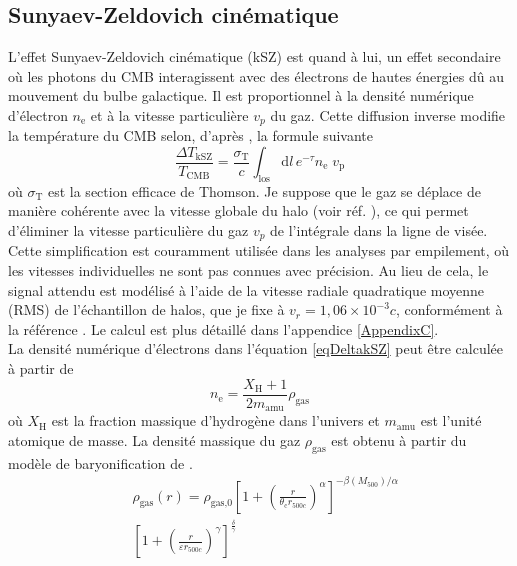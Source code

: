 \documentclass[a4paper, french, twoside, twocolumn, 11 pt]{article}
\newcommand{\deriv}{\mathrm{d}}
\begin{document}
\subsection{Sunyaev-Zeldovich cinématique}
L'effet Sunyaev-Zeldovich cinématique (kSZ) est quand à lui, un effet secondaire où les photons du CMB interagissent avec des électrons de hautes énergies dû au mouvement du bulbe galactique. Il est proportionnel à la densité numérique d'électron $n_\text{e}$ et à la vitesse particulière $v_p$ du gaz.
Cette diffusion inverse modifie la température du CMB selon, d'après \cite{Sunyaev_1972}, la formule suivante
\begin{equation}
\label{eqDeltakSZ}
\frac{\Delta T_\text{kSZ}}{T_\text{CMB}}=\frac{\sigma_\text{T}}{c}\int_\text{los} \deriv l\,e^{-\tau} n_\text{e} \; v_\text{p}
\end{equation}
où $\sigma_\text{T}$ est la section efficace de Thomson. Je suppose que le gaz se déplace de manière cohérente avec la vitesse globale du halo (voir réf. \cite{Hadzhiyska2023}), ce qui permet d'éliminer la vitesse particulière du gaz $v_p$ de l'intégrale dans la ligne de visée. Cette simplification est couramment utilisée dans les analyses par empilement, où les vitesses individuelles ne sont pas connues avec précision. Au lieu de cela, le signal attendu est modélisé à l'aide de la vitesse radiale quadratique moyenne (RMS) de l'échantillon de halos, que je fixe à $v_r = 1,06 \times 10^{-3}c$, conformément à la référence \cite{Amodeo2021}. Le calcul est plus détaillé dans l'appendice \ref{AppendixC}.\\
La densité numérique d'électrons dans l'équation \ref{eqDeltakSZ} peut être calculée à partir de
\begin{equation}
n_\mathrm{e} = \frac{X_\mathrm{H} + 1}{2 m_\mathrm{amu}} \rho_\mathrm{gas}
\end{equation}
où $X_\mathrm{H}$ est la fraction massique d'hydrogène dans l'univers et $m_\mathrm{amu}$ est l'unité atomique de masse. La densité massique du gaz $\rho_\mathrm{gas}$ est obtenu à partir du modèle de baryonification de \cite{schneider2025baryonificationalternativehydrodynamicalsimulations}.
\begin{equation}
\begin{split}
& \rho_\text{gas}(r) = \rho_\text{gas,0}\left[1+\left(\frac{r}{\theta_\text{c}r_{500c}}\right)^{\alpha}\right]^{-\beta(M_{500})/\alpha} \\
& \left[1+\left(\frac{r}{\varepsilon r_{500c}}\right)^{\gamma}\right]^{\frac{\delta}{\gamma}}
\end{split}
\end{equation}
\end{document}
